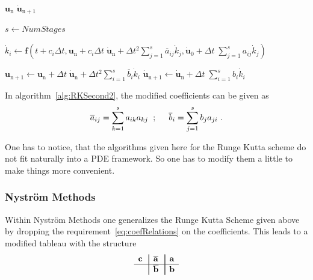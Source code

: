 \begin{algorithm}
\caption{Runge Kutta Scheme for Second order ODE (version 2)} \label{alg:RKSecond2}
\begin{algorithmic}
\REQUIRE $\mathbf{u}_{\mathrm{n}}$
\ENSURE  $\mathbf{\dot{u}}_{\mathrm{n}+1}$

\STATE $s \gets NumStages$

\STATE {}
\STATE $\dot{k}_i \gets \mathbf{f}(t+c_i\Delta t,\mathbf{u}_{\mathrm{n}} + c_i \Delta t\; \mathbf{\dot{u}}_\mathrm{n} +
\Delta t^2 \sum_{j=1}^{s} \overline{a}_{ij} \dot{k}_j, \mathbf{\dot{u}}_0 + \Delta t\; \sum_{j=1}^{s} a_{ij} \dot{k}_j)$
\ENDFOR

\STATE {}
\STATE $\mathbf{u}_{\mathrm{n}+1} \gets \mathbf{u}_{\mathrm{n}} + \Delta t\; \mathbf{\dot{u}}_\mathrm{n} + \Delta t^2
\sum_{i=1}^s \overline{b}_i \dot{k}_i$
\STATE {}
\STATE $\mathbf{\dot{u}}_{\mathrm{n}+1} \gets \mathbf{\dot{u}}_{\mathrm{n}} + \Delta t\; \sum_{i=1}^s b_i \dot{k}_i$
\end{algorithmic}
\end{algorithm}
In algorithm~\ref{alg:RKSecond2}, the modified coefficients can be given as
\begin{equation}\label{eq:coefRelations}
\overline{a}_{ij} = \sum_{k=1}^s a_{ik} a_{kj}\hspace{0.2cm}  ; \hspace{0.5cm} \overline{b}_{i} = \sum_{j=1}^s b_{j}
a_{ji}\ .
\end{equation}

One has to notice, that the algorithms given here for the Runge Kutta scheme do not fit naturally
into a PDE framework. So one has to modify them a little to make things more convenient.

\subsubsection{Nystr\"om Methods}
Within Nystr\"om Methods one generalizes the Runge Kutta Scheme given above by dropping the
requirement~\eqref{eq:coefRelations} on the coefficients.
This leads to a modified tableau with the structure
\begin{equation*}
\begin{array}{c|!{\vrule width 0.5pt}c|!{\vrule width 0.5pt}c}
\mathbf{c} & \mathbf{\overline{a}} & \mathbf{a} \\
\hline
& \mathbf{\overline{b}} &\mathbf{b}  \\
\end{array}
\end{equation*}

